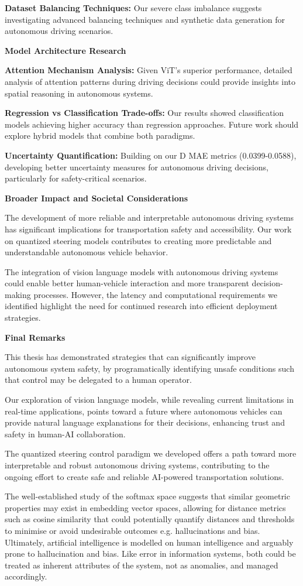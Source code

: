 \textbf{Dataset Balancing Techniques:} Our severe class imbalance suggests investigating advanced balancing techniques and synthetic data generation for autonomous driving scenarios.

\textbf{Model Architecture Research}

\textbf{Attention Mechanism Analysis:} Given ViT's superior performance, detailed analysis of attention patterns during driving decisions could provide insights into spatial reasoning in autonomous systems.

\textbf{Regression vs Classification Trade-offs:} Our results showed classification models achieving higher accuracy than regression approaches. Future work should explore hybrid models that combine both paradigms.

\textbf{Uncertainty Quantification:} Building on our D MAE metrics (0.0399-0.0588), developing better uncertainty measures for autonomous driving decisions, particularly for safety-critical scenarios.

\textbf{Broader Impact and Societal Considerations}

The development of more reliable and interpretable autonomous driving systems has significant implications for transportation safety and accessibility. Our work on quantized steering models contributes to creating more predictable and understandable autonomous vehicle behavior.

The integration of vision language models with autonomous driving systems could enable better human-vehicle interaction and more transparent decision-making processes. However, the latency and computational requirements we identified highlight the need for continued research into efficient deployment strategies.

\textbf{Final Remarks}

This thesis has demonstrated strategies that can significantly improve autonomous system safety, by programatically identifying unsafe conditions such that control may be delegated to a human operator.

Our exploration of vision language models, while revealing current limitations in real-time applications, points toward a future where autonomous vehicles can provide natural language explanations for their decisions, enhancing trust and safety in human-AI collaboration.

The quantized steering control paradigm we developed offers a path toward more interpretable and robust autonomous driving systems, contributing to the ongoing effort to create safe and reliable AI-powered transportation solutions.

The well-established study of the softmax space suggests that similar geometric properties may exist in embedding vector spaces, allowing for distance metrics such as cosine similarity that could potentially quantify distances and thresholds to minimise or avoid undesirable outcomes e.g. hallucinations and bias. Ultimately, artificial intelligence is modelled on human intelligence and arguably prone to hallucination and bias. Like error in information systems, both could be treated as inherent attributes of the system, not as anomalies, and managed accordingly.
